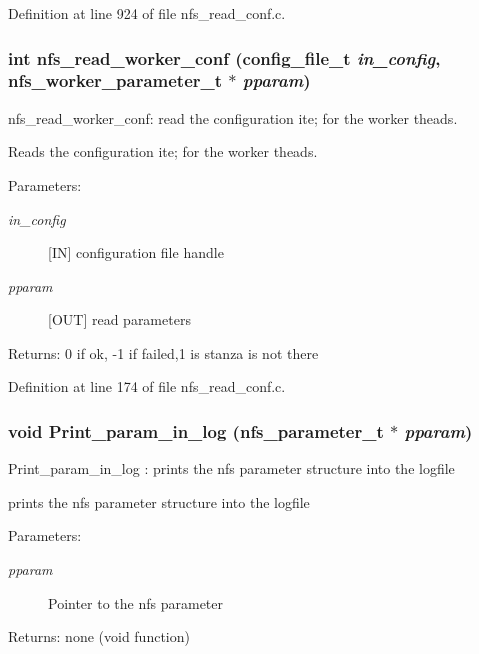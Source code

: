 Definition at line 924 of file nfs\_\-read\_\-conf.c.
\subsubsection{\setlength{\rightskip}{0pt plus 5cm}int nfs\_\-read\_\-worker\_\-conf (config\_\-file\_\-t {\em in\_\-config}, nfs\_\-worker\_\-parameter\_\-t $\ast$ {\em pparam})}\label{nfs__read__conf_8c_a0}


nfs\_\-read\_\-worker\_\-conf: read the configuration ite; for the worker theads.

Reads the configuration ite; for the worker theads.

\begin{Desc}
\item[Parameters:]
\begin{description}
\item[{\em in\_\-config}][IN] configuration file handle \item[{\em pparam}][OUT] read parameters\end{description}
\end{Desc}
\begin{Desc}
\item[Returns:]0 if ok, -1 if failed,1 is stanza is not there \end{Desc}


Definition at line 174 of file nfs\_\-read\_\-conf.c.
\subsubsection{\setlength{\rightskip}{0pt plus 5cm}void Print\_\-param\_\-in\_\-log (nfs\_\-parameter\_\-t $\ast$ {\em pparam})}\label{nfs__read__conf_8c_a11}


Print\_\-param\_\-in\_\-log : prints the nfs parameter structure into the logfile

prints the nfs parameter structure into the logfile

\begin{Desc}
\item[Parameters:]
\begin{description}
\item[{\em pparam}]Pointer to the nfs parameter\end{description}
\end{Desc}
\begin{Desc}
\item[Returns:]none (void function) \end{Desc}


